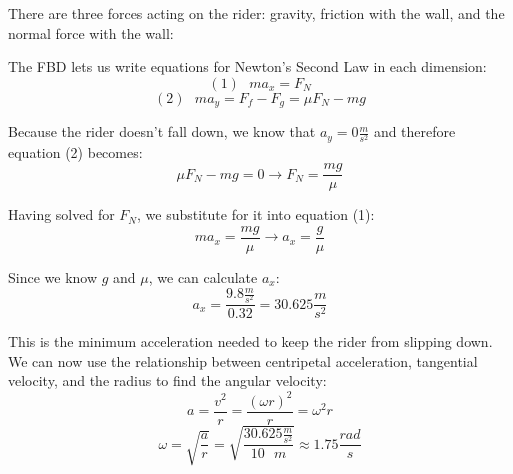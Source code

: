 \begin{Answer}[ref = gravitron]
There are three forces acting on the rider: gravity, friction with the wall, and the normal force with the wall:

\begin{center}
\end{center}

The FBD lets us write equations for Newton's Second Law in each dimension:
$$\left( 1 \right) \text{ }ma_x = F_N$$
$$\left( 2 \right) \text{ }ma_y = F_f - F_g = \mu F_N - mg$$

Because the rider doesn't fall down, we know that $a_y = 0 \frac{m}{s^2}$ and therefore equation (2) becomes:
$$\mu F_N - mg = 0 \to F_N = \frac{mg}{\mu}$$

Having solved for $F_N$, we substitute for it into equation (1):
$$ma_x = \frac{mg}{\mu} \to a_x = \frac{g}{\mu}$$

Since we know $g$ and $\mu$, we can calculate $a_x$:
$$a_x = \frac{9.8 \frac{m}{s^2}}{0.32} = 30.625 \frac{m}{s^2}$$

This is the minimum acceleration needed to keep the rider from slipping down. We can now use the relationship between centripetal acceleration, tangential velocity, and the radius to find the angular velocity:
$$a = \frac{v^2}{r} = \frac{\left( \omega r \right)^2}{r} = \omega^2 r$$
$$\omega = \sqrt{\frac{a}{r}} = \sqrt{\frac{30.625 \frac{m}{s^2}}{10 \text{ } m}} \approx 1.75 \frac{rad}{s}$$
\end{Answer}
